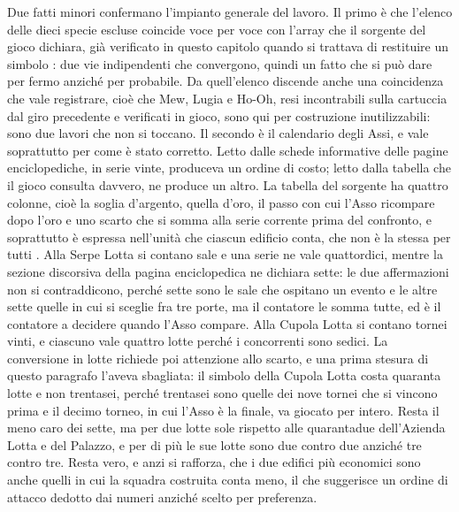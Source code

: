 Due fatti minori confermano l'impianto generale del lavoro. Il primo è che l'elenco delle dieci specie escluse coincide voce per voce con l'array che il sorgente del gioco dichiara, già verificato in questo capitolo quando si trattava di restituire un simbolo \cite{pokeemerald}: due vie indipendenti che convergono, quindi un fatto che si può dare per fermo anziché per probabile. Da quell'elenco discende anche una coincidenza che vale registrare, cioè che Mew, Lugia e Ho-Oh, resi incontrabili sulla cartuccia dal giro precedente e verificati in gioco, sono qui per costruzione inutilizzabili: sono due lavori che non si toccano. Il secondo è il calendario degli Assi, e vale soprattutto per come è stato corretto. Letto dalle schede informative delle pagine enciclopediche, in serie vinte, produceva un ordine di costo; letto dalla tabella che il gioco consulta davvero, ne produce un altro. La tabella del sorgente ha quattro colonne, cioè la soglia d'argento, quella d'oro, il passo con cui l'Asso ricompare dopo l'oro e uno scarto che si somma alla serie corrente prima del confronto, e soprattutto è espressa nell'unità che ciascun edificio conta, che non è la stessa per tutti \cite{pokeemerald}. Alla Serpe Lotta si contano sale e una serie ne vale quattordici, mentre la sezione discorsiva della pagina enciclopedica ne dichiara sette: le due affermazioni non si contraddicono, perché sette sono le sale che ospitano un evento e le altre sette quelle in cui si sceglie fra tre porte, ma il contatore le somma tutte, ed è il contatore a decidere quando l'Asso compare. Alla Cupola Lotta si contano tornei vinti, e ciascuno vale quattro lotte perché i concorrenti sono sedici. La conversione in lotte richiede poi attenzione allo scarto, e una prima stesura di questo paragrafo l'aveva sbagliata: il simbolo della Cupola Lotta costa quaranta lotte e non trentasei, perché trentasei sono quelle dei nove tornei che si vincono prima e il decimo torneo, in cui l'Asso è la finale, va giocato per intero. Resta il meno caro dei sette, ma per due lotte sole rispetto alle quarantadue dell'Azienda Lotta e del Palazzo, e per di più le sue lotte sono due contro due anziché tre contro tre. Resta vero, e anzi si rafforza, che i due edifici più economici sono anche quelli in cui la squadra costruita conta meno, il che suggerisce un ordine di attacco dedotto dai numeri anziché scelto per preferenza.

